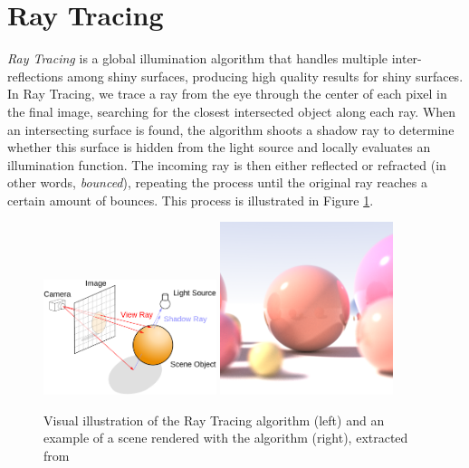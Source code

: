 \section{Ray Tracing}

\textit{Ray Tracing} \cite{Whitted:1980} is a global illumination algorithm that handles multiple inter-reflections among shiny surfaces, producing high quality results for shiny surfaces. In Ray Tracing, we trace a ray from the eye through the center of each pixel in the final image, searching for the closest intersected object along each ray. When an intersecting surface is found, the algorithm shoots a shadow ray to determine whether this surface is hidden from the light source and locally evaluates an illumination function. The incoming ray is then either reflected or refracted (in other words, \textit{bounced}), repeating the process until the original ray reaches a certain amount of bounces. This process is illustrated in Figure \ref{fig:raytracing}.

\begin{figure}[h]
  \centering
  \includegraphics[width=0.45\textwidth,height=\textheight,keepaspectratio]{images/3_theoretical_foundations/raytracing.png}
  \includegraphics[width=0.45\textwidth,height=\textheight,keepaspectratio]{images/3_theoretical_foundations/raytracingexample.png}
  \caption{Visual illustration of the Ray Tracing algorithm (left) and an example of a scene rendered with the algorithm (right), extracted from \cite{wiki:raytracing}}
  \label{fig:raytracing}
\end{figure}

